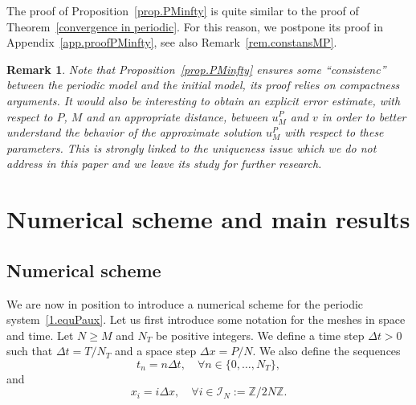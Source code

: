 \documentclass[11pt]{amsart}
\newtheorem{remark}{Remark}
\newcommand{\Z}{\mathbb{Z}}
\newcommand{\I}{\mathcal{I}_N}
\begin{document}
The proof of Proposition~\ref{prop.PMinfty} is quite similar to the proof of Theorem~\ref{convergence in periodic}. For this reason, we postpone its proof in Appendix~\ref{app.proofPMinfty}, see also Remark~\ref{rem.constansMP}.

\begin{remark}
Note that Proposition~\ref{prop.PMinfty}  ensures some ``consistenc'' between the periodic model and the initial model, its proof relies on compactness arguments. It would also be interesting to obtain an explicit error estimate, with respect to $P$, $M$ and an appropriate distance, between $u^P_M$ and $v$ in order to better understand the behavior of the approximate solution $u^P_M$ with respect to these parameters. This is strongly linked to the uniqueness issue which we do not address in this paper and we leave its study for further research.
\end{remark}


\section{Numerical scheme and main results}\label{sec.nummain}

\subsection{Numerical scheme}\label{sec.numsch}

We are now in position to introduce a numerical scheme for the periodic system~\eqref{1.equPaux}. Let us first introduce some notation for the meshes in space and time. Let $N \ge M$ and $N_T$ be positive integers. We define a time step $\Delta t > 0$ such that $\Delta t = T/N_T$ and a space step $\Delta x = P/N$. We also define the sequences
\[
t_n =n\Delta t, \quad \forall n \in \{0,\ldots, N_T\},
\]
 and
\[
x_i = i \Delta x, \quad \forall i\in \I := \Z/2N\Z.
\]
\end{document}

